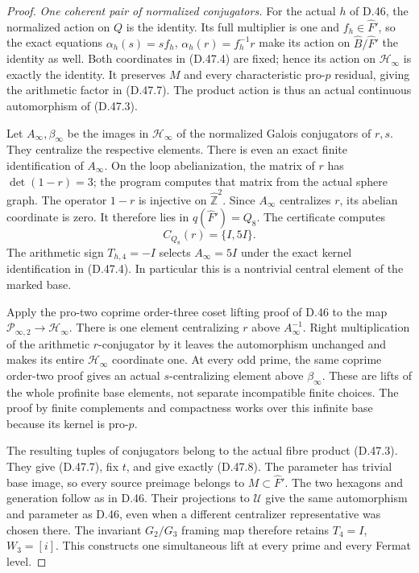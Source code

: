 \begin{proof}
\emph{One coherent pair of normalized conjugators.}
For the actual \(h\)
of D.46, the normalized
action on \(Q\) is
the identity. Its
full multiplier is
one and \(f_h\in
\widehat F'\), so
the exact equations
\(\alpha_h(s)=s f_h\),
\(\alpha_h(r)=f_h^{-1}r\)
make its action on
\(\widehat B/\widehat F'\)
the identity as well.
Both coordinates in
(D.47.4) are fixed;
hence its action on
\(\mathcal H_\infty\)
is exactly the identity.
It preserves \(M\)
and every characteristic
pro-\(p\) residual,
giving the arithmetic
factor in (D.47.7).
The product action
is thus an actual
continuous automorphism
of (D.47.3).

Let \(A_\infty,\beta_\infty\)
be the images in
\(\mathcal H_\infty\)
of the normalized
Galois conjugators
of \(r,s\).
They centralize
the respective
elements. There is
even an exact
finite identification
of \(A_\infty\).
On the loop
abelianization,
the matrix of \(r\)
has
\(\det(1-r)=3\);
the program computes
that matrix from
the actual sphere
graph. The operator
\(1-r\) is injective
on
\(\widehat{\mathbb Z}^2\).
Since \(A_\infty\)
centralizes \(r\),
its abelian coordinate
is zero. It therefore
lies in \(q(\widehat F')
=Q_8\). The certificate
computes
\[
 C_{Q_8}(r)=\{I,5I\}.
\]
The arithmetic sign
\(T_{h,4}=-I\)
selects \(A_\infty=5I\)
under the exact
kernel identification
in (D.47.4).
In particular this
is a nontrivial
central element of
the marked base.

Apply the pro-two
coprime order-three
coset lifting proof
of D.46 to the map
\(\mathcal P_{\infty,2}
\to\mathcal H_\infty\).
There is one element
centralizing \(r\)
above \(A_\infty^{-1}\).
Right multiplication
of the arithmetic
\(r\)-conjugator
by it leaves the
automorphism unchanged
and makes its entire
\(\mathcal H_\infty\)
coordinate one.
At every odd prime,
the same coprime
order-two proof
gives an actual
\(s\)-centralizing
element above
\(\beta_\infty\).
These are lifts
of the whole
profinite base
elements, not
separate incompatible
finite choices.
The proof by finite
complements and
compactness works
over this infinite
base because its
kernel is pro-\(p\).

The resulting tuples
of conjugators belong
to the actual fibre
product (D.47.3).
They give (D.47.7),
fix \(t\), and give
exactly (D.47.8).
The parameter has
trivial base image,
so every source
preimage belongs
to \(M\subset
\widehat F'\).
The two hexagons
and generation
follow as in D.46.
Their projections
to \(\mathcal U\)
give the same
automorphism and
parameter as D.46,
even when a different
centralizer representative
was chosen there.
The invariant
\(G_2/G_3\)
framing map therefore
retains \(T_4=I\),
\(W_3=[i]\).
This constructs
one simultaneous
lift at every
prime and every
Fermat level.


\end{proof}
